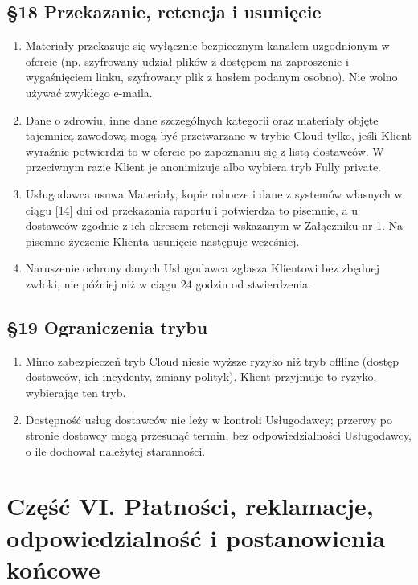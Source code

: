 \documentclass[11pt,a4paper]{article}
\begin{document}
\subsection*{§18 Przekazanie, retencja i usunięcie}
\begin{enumerate}
\item Materiały przekazuje się wyłącznie bezpiecznym kanałem uzgodnionym w ofercie (np. szyfrowany udział plików z dostępem na zaproszenie i wygaśnięciem linku, szyfrowany plik z hasłem podanym osobno). Nie wolno używać zwykłego e-maila.
\item Dane o zdrowiu, inne dane szczególnych kategorii oraz materiały objęte tajemnicą zawodową mogą być przetwarzane w trybie Cloud tylko, jeśli Klient wyraźnie potwierdzi to w ofercie po zapoznaniu się z listą dostawców. W przeciwnym razie Klient je anonimizuje albo wybiera tryb Fully private.
\item Usługodawca usuwa Materiały, kopie robocze i dane z systemów własnych w ciągu [14] dni od przekazania raportu i potwierdza to pisemnie, a u dostawców zgodnie z ich okresem retencji wskazanym w Załączniku nr 1. Na pisemne życzenie Klienta usunięcie następuje wcześniej.
\item Naruszenie ochrony danych Usługodawca zgłasza Klientowi bez zbędnej zwłoki, nie później niż w ciągu 24 godzin od stwierdzenia.
\end{enumerate}

\subsection*{§19 Ograniczenia trybu}
\begin{enumerate}
\item Mimo zabezpieczeń tryb Cloud niesie wyższe ryzyko niż tryb offline (dostęp dostawców, ich incydenty, zmiany polityk). Klient przyjmuje to ryzyko, wybierając ten tryb.
\item Dostępność usług dostawców nie leży w kontroli Usługodawcy; przerwy po stronie dostawcy mogą przesunąć termin, bez odpowiedzialności Usługodawcy, o ile dochował należytej staranności.
\end{enumerate}

\section*{Część VI. Płatności, reklamacje, odpowiedzialność i postanowienia końcowe}
\end{document}
